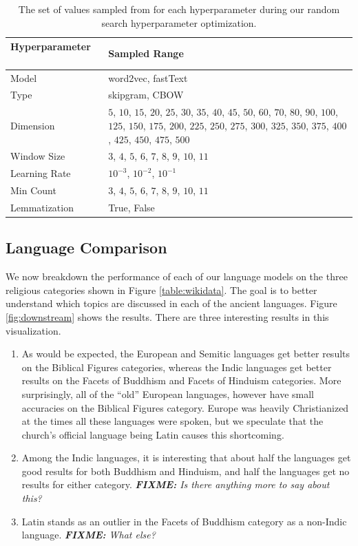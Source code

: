 \documentclass[11pt,a4paper]{article}
\newcommand{\fixme}[1]{{\color{red}\itshape \textbf{FIXME:} {#1}}}
\begin{document}
\begin{table}
    \small
    \centering
   \begin{tabular}{lp{4cm}}
    \toprule
    Hyperparameter ~~~ & Sampled Range \\
   \midrule
   Model & word2vec, fastText \\ [4pt]
   Type & skipgram, CBOW \\ [4pt]
   Dimension & $5$, $10$, $15$, $20$, $25$, $30$, $35$, $40$, $45$, $50$,
                          $60$, $70$, $80$, $90$, $100$,
                          $125$, $150$, $175$, $200$, $225$, $250$, $275$, $300$, $325$, $350$, $375$, $400$, $425$, $450$, $475$, $500$ \\[4pt]
   Window Size & $3$, $4$, $5$, $6$, $7$, $8$, $9$, $10$, $11$ \\ [4pt]
   Learning Rate & $10^{-3}$, $10^{-2}$, $10^{-1}$ \\ [4pt]
   Min Count & $3$, $4$, $5$, $6$, $7$, $8$, $9$, $10$, $11$ \\ [4pt]
   Lemmatization & True, False \\ [2pt]
   \bottomrule
    \end{tabular}
    \caption{The set of values sampled from for each hyperparameter during our random search hyperparameter optimization.}
    \label{table:hyperparam}
\end{table}

\subsection{Language Comparison}

We now breakdown the performance of each of our language models on the three religious categories shown in Figure \ref{table:wikidata}.
The goal is to better understand which topics are discussed in each of the ancient languages.
Figure \ref{fig:downstream} shows the results.
There are three interesting results in this visualization.
\begin{enumerate}
\item
As would be expected, the European and Semitic languages get better results on the Biblical Figures categories,
whereas the Indic languages get better results on the Facets of Buddhism and Facets of Hinduism categories.
More surprisingly, all of the ``old'' European languages,
however have small accuracies on the Biblical Figures category.
Europe was heavily Christianized at the times all these languages were spoken,
but we speculate that the church's official language being Latin causes this shortcoming.
\item
Among the Indic languages, it is interesting that about half the languages get good results for both Buddhism and Hinduism, and half the languages get no results for either category.
\fixme{Is there anything more to say about this?}
\item
Latin stands as an outlier in the Facets of Buddhism category as a non-Indic language.
\fixme{What else?}
\end{enumerate}
\end{document}
